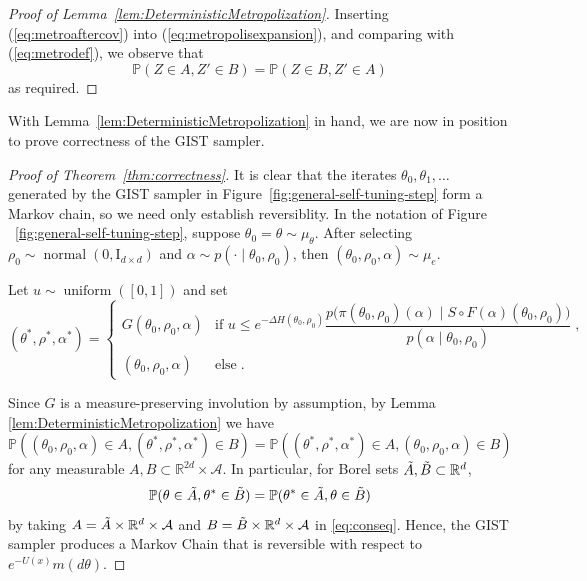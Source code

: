 \documentclass[letterpaper,11pt]{article}
\theoremstyle{plain}%
\theoremstyle{remark}
\newcommand{\prb}{\mathbb{P}}
\begin{document}
\begin{proof}[Proof of Lemma~\ref{lem:DeterministicMetropolization}]
Inserting (\ref{eq:metroaftercov}) into (\ref{eq:metropolisexpansion}), and comparing with (\ref{eq:metrodef}), we observe that
\[\prb(Z \in A , Z' \in B) = \prb(Z \in B , Z' \in A)\]
as required.
\end{proof}

With Lemma~\ref{lem:DeterministicMetropolization} in hand, we are now in position to prove correctness of the GIST sampler. 


\begin{proof}[Proof of Theorem~\ref{thm:correctness}]
It is clear that the iterates $\theta_0, \theta_1, \dots$ generated by the GIST sampler in Figure~\ref{fig:general-self-tuning-step} form a Markov chain, so we need only establish reversiblity. 
In the notation of Figure ~\ref{fig:general-self-tuning-step}, suppose  $ \theta_0  = \theta \sim \mu_{\theta}$. After selecting $\rho_0 \sim \operatorname{normal}(0, \mathrm{I}_{d \times d})$  and $\alpha \sim p( \cdot \mid \theta_0, \rho_0)$, then $(\theta_0, \rho_0, \alpha) \sim \mu_e$. 

Let $u \sim \operatorname{uniform}([0,1])$ and set 
\[
(\theta^*, \rho^*, \alpha^*) =\begin{cases}
G(\theta_0, \rho_0, \alpha) & \text{if  } u \le e^{-\Delta H(\theta_0, \rho_0)} \dfrac{p\Big( \pi(\theta_0, \rho_0)(\alpha) \mid S \circ F(\alpha)(\theta_0, \rho_0) \Big)}{p(\alpha \mid \theta_0, \rho_0)}  \;,  \\
(\theta_0, \rho_0, \alpha) & \text{else} \;.
\end{cases}
\]


Since $G$ is a measure-preserving involution by assumption, by Lemma \ref{lem:DeterministicMetropolization} we have \begin{equation} \label{eq:conseq} \mathbb{P}((\theta_0, \rho_0, \alpha) \in A, (\theta^*, \rho^*, \alpha^*) \in B)  = \mathbb{P}( (\theta^*, \rho^*, \alpha^*) \in A, (\theta_0, \rho_0, \alpha) \in B)\end{equation}
for any measurable $A,B \subset \mathbb{R}^{2d} \times \mathcal{A}$. In particular, for Borel sets $\Tilde{A}, \Tilde{B} \subset \mathbb{R}^d$,
\[ \mathbb{P}( \theta \in \Tilde{A}, \theta^* \in \Tilde{B}) = \mathbb{P}(\theta^* \in \Tilde{A}, \theta \in \Tilde{B})\]
by taking $A = \Tilde{A} \times \mathbb{R}^{d} \times \mathcal{A}$ and $B = \Tilde{B} \times \mathbb{R}^d \times \mathcal{A}$ in \eqref{eq:conseq}.  Hence, the GIST sampler produces a  Markov Chain that is reversible with respect to  $ e^{-U(x)} m(d \theta)$.
\end{proof}
\end{document}
